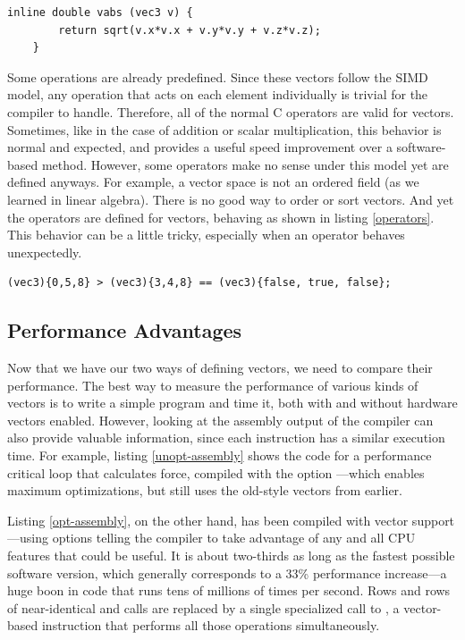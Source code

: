 \documentclass[thesis.tex]{subfiles}
\begin{document}
\begin{lstlisting}[caption={Implementing the absolute value function in software\label{software-implem}}]
    inline double vabs (vec3 v) {
        return sqrt(v.x*v.x + v.y*v.y + v.z*v.z);
    }
\end{lstlisting}

Some operations are already predefined. Since these vectors follow the SIMD model, any operation that acts on each element individually is trivial for the compiler to handle. Therefore, all of the normal C operators are valid for vectors. Sometimes, like in the case of addition or scalar multiplication, this behavior is normal and expected, and provides a useful speed improvement over a software-based method. However, some operators make no sense under this model yet are defined anyways. For example, a vector space is not an ordered field (as we learned in linear algebra). There is no good way to order or sort vectors. And yet the \code{< >} operators are defined for vectors, behaving as shown in listing \ref{operators}. This behavior can be a little tricky, especially when an operator behaves unexpectedly.

\begin{lstlisting}[caption={Some operations aren't especially useful\label{operators}}]
    (vec3){0,5,8} > (vec3){3,4,8} == (vec3){false, true, false};
\end{lstlisting}



\subsection{Performance Advantages}

Now that we have our two ways of defining vectors, we need to compare their performance. The best way to measure the performance of various kinds of vectors is to write a simple program and time it, both with and without hardware vectors enabled. However, looking at the assembly output of the compiler can also provide valuable information, since each instruction has a similar execution time. For example, listing \ref{unopt-assembly} shows the code for a performance critical loop that calculates force, compiled with the option ---which enables maximum optimizations, but still uses the old-style vectors from earlier.

Listing \ref{opt-assembly}, on the other hand, has been compiled with vector support---using options  telling the compiler to take advantage of any and all CPU features that could be useful. It is about two-thirds as long as the fastest possible software version, which generally corresponds to a 33\% performance increase---a huge boon in code that runs tens of millions of times per second. Rows and rows of near-identical  and  calls are replaced by a single specialized call to , a vector-based instruction that performs all those operations simultaneously.
\end{document}
